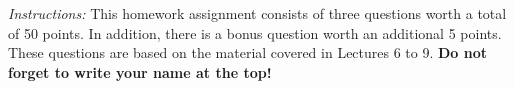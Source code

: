 

\oddsidemargin 0in
\evensidemargin 0in
\textwidth 6.5in
\topmargin -0.5in
\textheight 9.0in

\usepackage{hyperref}
\usepackage{float}
\usepackage{pdfpages}
\usepackage{textcomp}
\usepackage{mathtools}
\usepackage{algorithm}
\usepackage{array}
\usepackage{tabu}
\usepackage{changepage}
\usepackage{amsmath}
\usepackage{amssymb}
\usepackage[noend]{algpseudocode}
\usepackage{graphicx,url,epstopdf}
\usepackage{xcolor}
\makeatletter
\def\BState{\State\hskip-\ALG@thistlm}
\makeatother
\sloppy
\usepackage{colortbl}


\newcommand\tab[1][1cm]{\hspace*{#1}}
\newcommand{\minus}{\scalebox{0.75}[1.0]{$-$}}




\pagestyle{myheadings}  %

\noindent\emph{Instructions:} This homework assignment consists of three questions worth a total of 50 points. 
In addition, there is a bonus question worth an additional 5 points.
These questions are based on the material covered in Lectures 6 to 9.
\textbf{Do not forget to write your name at the top!}

